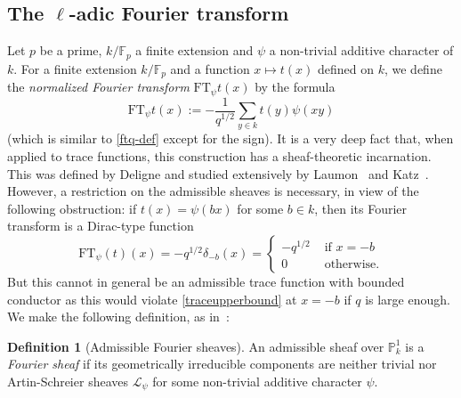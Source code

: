 \documentclass[12pt,a4paper,reqno]{amsart}
\numberwithin{equation}{section}
\newcommand{\FT}{\mathrm{FT}}
\theoremstyle{plain}
\theoremstyle{definition}
\newtheorem{definition}[theorem]{Definition}
\newcommand\F{\mathbb{F}}
\newcommand\mcL{\mathcal{L}}
\newcommand\Pl{\mathbb{P}^1}
\newcommand\Fp{\F_{p}}
\begin{document}
\subsection{The $\ell$-adic Fourier transform}

Let $p$ be a prime, $k/\Fp$ a finite extension and $\psi$ a
non-trivial additive character of $k$. For a finite extension $k/\Fp$
and a function $x\mapsto t(x)$ defined on $k$, we define the
\emph{normalized Fourier transform} $\FT_\psi t(x)$ by the formula
$$
\FT_\psi t(x):=-\frac{1}{q^{1/2}}\sum_{y\in k}t(y)\psi(xy)
$$
(which is similar to \eqref{ftq-def} except for the sign).  It is a
very deep fact that, when applied to trace functions, this
construction has a sheaf-theoretic incarnation. This was defined by
Deligne and studied extensively by Laumon~\cite{laumon} and
Katz~\cite{GKM}.  However, a restriction on the admissible sheaves is
necessary, in view of the following obstruction: if $t(x)=\psi(bx)$
for some $b\in k$, then its Fourier transform is a Dirac-type function
$$
\FT_\psi(t)(x)=-q^{1/2}\delta_{-b}(x)=
\begin{cases}-q^{1/2}&\text{ if $x=-b$}\\
  0&\text{ otherwise.}
\end{cases}
$$
But this cannot in general be an admissible trace function with
bounded conductor as this would violate \eqref{traceupperbound} at
$x=-b$ if $q$ is large enough.  We make the following definition, as
in~\cite{GKM}:

\begin{definition}[Admissible Fourier sheaves] An admissible sheaf
  over $\Pl_k$ is a \emph{Fourier sheaf} if its geometrically
  irreducible components are neither trivial nor Artin-Schreier
  sheaves $\mcL_{\psi}$ for some non-trivial additive character
  $\psi$.
\end{definition}
\end{document}
